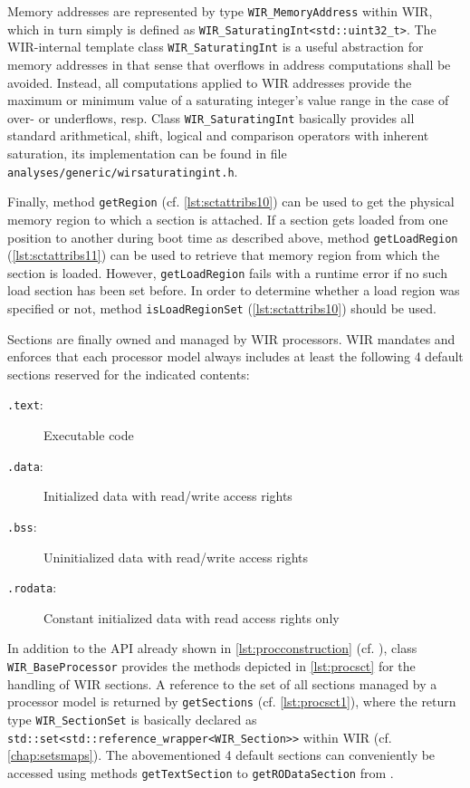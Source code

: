 Memory addresses are represented by type \texttt{WIR\_MemoryAddress}\label{page:memaddr} within \gls{WIR}, which in turn simply is defined as \texttt{WIR\_SaturatingInt<std::uint32\_t>}.
The \gls{WIR}-internal template class \texttt{WIR\_SaturatingInt} is a useful abstraction for memory addresses in that sense that overflows in address computations shall be avoided.
Instead, all computations applied to \gls{WIR} addresses provide the maximum or minimum value of a saturating integer's value range in the case of over- or underflows, resp.
Class \texttt{WIR\_SaturatingInt} basically provides all standard arithmetical, shift, logical and comparison operators with inherent saturation, its implementation can be found in file \texttt{analyses/generic/wirsaturatingint.h}.

Finally, method \texttt{getRegion} (cf. \cref{lst:sctattribs10}) can be used to get the physical memory region to which a section is attached.
If a section gets loaded from one position to another during boot time as described above, method \texttt{getLoadRegion} (\cref{lst:sctattribs11}) can be used to retrieve that memory region from which the section is loaded.
However, \texttt{getLoadRegion} fails with a runtime error if no such load section has been set before.
In order to determine whether a load region was specified or not, method \texttt{isLoadRegionSet} (\cref{lst:sctattribs10}) should be used.

Sections are finally owned and managed by \gls{WIR} processors.
\gls{WIR} mandates and enforces that each processor model always includes at least the following 4 default sections reserved for the indicated contents:
\begin{description}
  \item[\texttt{.text}:] Executable code
  \item[\texttt{.data}:] Initialized data with read/write access rights
  \item[\texttt{.bss}:] Uninitialized data with read/write access rights
  \item[\texttt{.rodata}:] Constant initialized data with read access rights only
\end{description}

In addition to the \gls{API} already shown in \cref{lst:procconstruction} (cf. ), class \texttt{WIR\_BaseProcessor} provides the methods depicted in \cref{lst:procsct} for the handling of \gls{WIR} sections.
A reference to the set of all sections managed by a processor model is returned by \texttt{getSections} (cf. \cref{lst:procsct1}), where the return type \texttt{WIR\_SectionSet} is basically declared as \texttt{std::set<std::reference\_wrapper<WIR\_Section>{}>} within \gls{WIR} (cf. \cref{chap:setsmaps}).
The abovementioned 4 default sections can conveniently be accessed using methods \texttt{getTextSection} to \texttt{getRODataSection} from .

